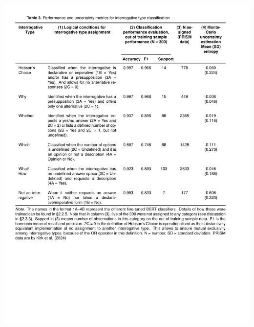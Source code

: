 \documentclass[
  12pt,
]{article}
\begin{document}
\includegraphics{../03_outputs/01_taxonomies_of_interrogatives/table_3.pdf}
\end{document}
